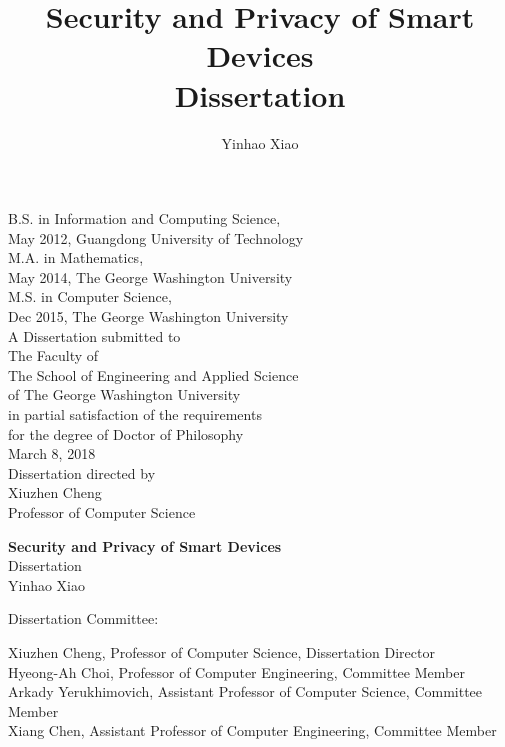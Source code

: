 \documentclass[letterpaper,12pt]{article}
\begin{document}
   \author{{\normalsize Yinhao Xiao}}
   \title{\Large{\bf Security and Privacy of Smart Devices} \\ \large Dissertation}
   \date{}
   \maketitle
   \thispagestyle{empty}
   \begin{center}
       B.S. in Information and Computing Science,\\ May 2012, Guangdong University of Technology \\
       M.A. in Mathematics,\\ May 2014, The George Washington University \\
       M.S. in Computer Science,\\ Dec 2015, The George Washington University \\[\baselineskip]
       
       A Dissertation submitted to\\
       The Faculty of\\The School of Engineering and Applied Science\\ of The George
       Washington University\\ in partial satisfaction of the requirements\\ for the degree
       of Doctor of Philosophy\\[\baselineskip]
       March 8, 2018\\[\baselineskip]
       Dissertation directed by\\[\baselineskip]
       Xiuzhen Cheng\\Professor of Computer Science
   \end{center}
   \pagestyle{plain}
   \setcounter{page}{1}


   \newpage
   \doublespacing
   \begin{center}
   {\Large{\bf Security and Privacy of Smart Devices}\\ \large Dissertation}\\[\baselineskip]
   {\normalsize Yinhao Xiao}
   \end{center}
   \noindent Dissertation Committee:\\

   \hfill\begin{minipage}{5in}
   {Xiuzhen Cheng, Professor of Computer Science, Dissertation
       Director}\\[\baselineskip]
  {Hyeong-Ah Choi, Professor of Computer Engineering, Committee Member}\\[\baselineskip]
  {Arkady Yerukhimovich, Assistant Professor of Computer Science, Committee Member}\\[\baselineskip]
   {Xiang Chen, Assistant Professor of Computer Engineering, Committee Member}\\[\baselineskip]

   
   
   \end{minipage}
\end{document}
